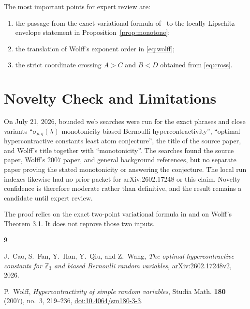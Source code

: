 \documentclass[11pt]{article}
\begin{document}
The most important points for expert review are:
\begin{enumerate}
\item the passage from the exact variational formula of~\cite{CaoEtAl} to the
locally Lipschitz envelope statement in Proposition~\ref{prop:monotone};
\item the translation of Wolff's exponent order in \eqref{eq:wolff};
\item the strict coordinate crossing $A>C$ and $B<D$ obtained from
\eqref{eq:cross}.
\end{enumerate}

\section*{Novelty Check and Limitations}

On July 21, 2026, bounded web searches were run for the exact phrases and
close variants ``$\sigma_{p,q}(\lambda)$ monotonicity biased Bernoulli
hypercontractivity'', ``optimal hypercontractive constants least atom
conjecture'', the title of the source paper, and Wolff's title together with
``monotonicity''.  The searches found the source paper, Wolff's 2007 paper,
and general background references, but no separate paper proving the stated
monotonicity or answering the conjecture.  The local run indexes likewise had
no prior packet for arXiv:2602.17248 or this claim.  Novelty confidence is
therefore moderate rather than definitive, and the result remains a candidate
until expert review.

The proof relies on the exact two-point variational formula in
\cite{CaoEtAl} and on Wolff's Theorem 3.1.  It does not reprove those two
inputs.

\begin{thebibliography}{9}

J.~Cao, S.~Fan, Y.~Han, Y.~Qiu, and Z.~Wang,
\emph{The optimal hypercontractive constants for $\mathbb Z_3$ and biased
Bernoulli random variables}, arXiv:2602.17248v2, 2026.

P.~Wolff,
\emph{Hypercontractivity of simple random variables},
Studia Math. \textbf{180} (2007), no.~3, 219--236,
\href{https://doi.org/10.4064/sm180-3-3}{doi:10.4064/sm180-3-3}.

\end{thebibliography}
\end{document}
